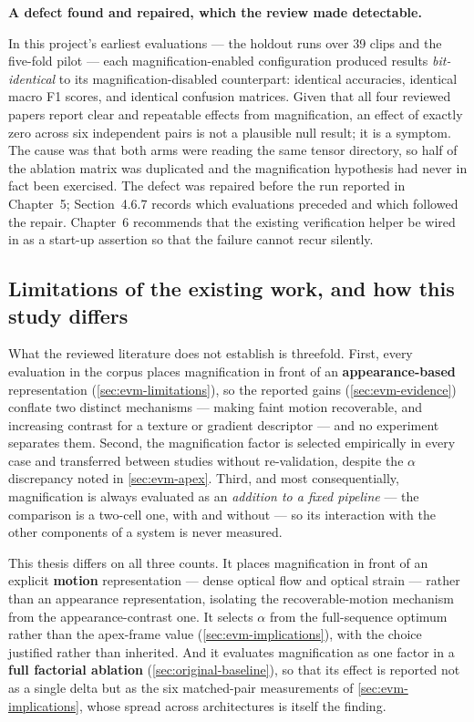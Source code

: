 \textbf{A defect found and repaired, which the review made detectable.}

In this project's earliest evaluations --- the holdout runs over 39 clips and the five-fold pilot --- each magnification-enabled configuration produced results \textit{bit-identical} to its magnification-disabled counterpart: identical accuracies, identical macro F1 scores, and identical confusion matrices. Given that all four reviewed papers report clear and repeatable effects from magnification, an effect of exactly zero across six independent pairs is not a plausible null result; it is a symptom. The cause was that both arms were reading the same tensor directory, so half of the ablation matrix was duplicated and the magnification hypothesis had never in fact been exercised. The defect was repaired before the run reported in Chapter~5; Section~4.6.7 records which evaluations preceded and which followed the repair. Chapter~6 recommends that the existing verification helper be wired in as a start-up assertion so that the failure cannot recur silently.

\subsection{Limitations of the existing work, and how this study differs}
\label{sec:evm-gap}

What the reviewed literature does not establish is threefold. First, every evaluation in the corpus places magnification in front of an \textbf{appearance-based} representation (\autoref{sec:evm-limitations}), so the reported gains (\autoref{sec:evm-evidence}) conflate two distinct mechanisms --- making faint motion recoverable, and increasing contrast for a texture or gradient descriptor --- and no experiment separates them. Second, the magnification factor is selected empirically in every case and transferred between studies without re-validation, despite the $\alpha$ discrepancy noted in \autoref{sec:evm-apex}. Third, and most consequentially, magnification is always evaluated as an \textit{addition to a fixed pipeline} --- the comparison is a two-cell one, with and without --- so its interaction with the other components of a system is never measured.

This thesis differs on all three counts. It places magnification in front of an explicit \textbf{motion} representation --- dense optical flow and optical strain --- rather than an appearance representation, isolating the recoverable-motion mechanism from the appearance-contrast one. It selects $\alpha$ from the full-sequence optimum rather than the apex-frame value (\autoref{sec:evm-implications}), with the choice justified rather than inherited. And it evaluates magnification as one factor in a \textbf{full factorial ablation} (\autoref{sec:original-baseline}), so that its effect is reported not as a single delta but as the six matched-pair measurements of \autoref{sec:evm-implications}, whose spread across architectures is itself the finding.

